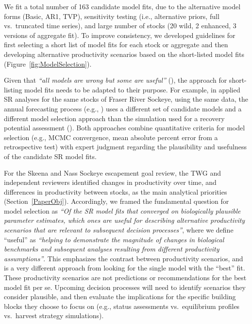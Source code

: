 \documentclass[french,11pt]{book}
\begin{document}
We fit a total number of 163 candidate model fits, due to the alternative model forms (Basic, AR1, TVP), sensitivity testing (i.e., alternative priors, full vs.~truncated time series), and large number of stocks (20 wild, 2 enhanced, 3 versions of aggregate fit). To improve consistency, we developed guidelines for first selecting a short list of model fits for each stock or aggregate and then developing alternative productivity scenarios based on the short-listed model fits (Figure~\ref{fig:ModelSelection}).

Given that \emph{``all models are wrong but some are useful''} (), the approach for short-listing model fits needs to be adapted to their purpose. For example, in applied SR analyses for the same stocks of Fraser River Sockeye, using the same data, the annual forecasting process (e.g., ) uses a different set of candidate models and a different model selection approach than the simulation used for a recovery potential assessment (). Both approaches combine quantitative criteria for model selection (e.g., MCMC convergence, mean absolute percent error from a retrospective test) with expert judgment regarding the plausibility and usefulness of the candidate SR model fits.

For the Skeena and Nass Sockeye escapement goal review, the TWG and independent reviewers identified changes in productivity over time, and differences in productivity between stocks, as the main analytical priorities (Section~\ref{PaperObj}). Accordingly, we framed the fundamental question for model selection as \emph{``Of the SR model fits that converged on biologically plausible parameter estimates, which ones are useful for describing alternative productivity scenarios that are relevant to subsequent decision processes''}, where we define ``useful'' as \emph{``helping to demonstrate the magnitude of changes in biological benchmarks and subsequent analyses resulting from different productivity assumptions''}. This emphasizes the contrast between productivity scenarios, and is a very different approach from looking for the single model with the ``best'' fit. These productivity scenarios are not predictions or recommendations for the best model fit per se. Upcoming decision processes will need to identify scenarios they consider plausible, and then evaluate the implications for the specific building blocks they choose to focus on (e.g., status assessments vs.~equilibrium profiles vs.~harvest strategy simulations).
\end{document}
